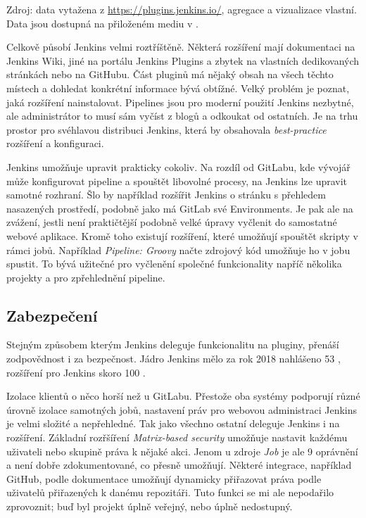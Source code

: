{\begin{iffigure}
                \caption{Zdroj: data vytažena z \url{https://plugins.jenkins.io/}, agregace a vizualizace vlastní. Data jsou dostupná na přiloženém mediu v .}
            \end{iffigure}
            \clearpage
        }

        Celkově působí Jenkins velmi roztříštěně. Některá rozšíření mají dokumentaci na Jenkins Wiki, jiné na portálu Jenkins Plugins a zbytek na vlastních dedikovaných stránkách nebo na GitHubu. Část pluginů má nějaký obsah na všech těchto místech a dohledat konkrétní informace bývá obtížné. Velký problém je poznat, jaká rozšíření nainstalovat. Pipelines jsou pro moderní použití Jenkins nezbytné, ale administrátor to musí sám vyčíst z blogů a odkoukat od ostatních. Je na trhu prostor pro svéhlavou distribuci Jenkins, která by obsahovala \textit{best-practice} rozšíření a konfiguraci.

        Jenkins umožňuje upravit prakticky cokoliv. Na rozdíl od GitLabu, kde vývojář může konfigurovat pipeline a spouštět libovolné procesy, na Jenkins lze upravit samotné rozhraní. Šlo by například rozšířit Jenkins o stránku s přehledem nasazených prostředí, podobně jako má GitLab své Environments. Je pak ale na zvážení, jestli není praktičtější podobně velké úpravy vyčlenit do samostatné webové aplikace. Kromě toho existují rozšíření, které umožňují spouštět skripty v rámci jobů. Například \textit{Pipeline: Groovy} načte zdrojový kód umožňuje ho v jobu spustit. To bývá užitečné pro vyčlenění společné funkcionality napříč několika projekty a pro zpřehlednění pipeline.

    \subsection{Zabezpečení}
        Stejným způsobem kterým Jenkins deleguje funkcionalitu na pluginy, přenáší zodpovědnost i za bezpečnost. Jádro Jenkins mělo za rok 2018 nahlášeno 53 , rozšíření pro Jenkins skoro 100 \cite{cve-jenkins}. 

        Izolace klientů o něco horší než u GitLabu. Přestože oba systémy podporují různé úrovně izolace samotných jobů, nastavení práv pro webovou administraci Jenkins je velmi složité a nepřehledné. Tak jako všechno ostatní deleguje Jenkins i  na rozšíření. Základní rozřšíření \textit{Matrix-based security} umožňuje nastavit každému uživateli nebo skupině práva k nějaké akci. Jenom u zdroje \textit{Job} je ale 9 oprávnění a není dobře zdokumentované, co přesně umožňují. Některé integrace, například GitHub, podle dokumentace umožňují dynamicky přiřazovat práva podle uživatelů přiřazených k danému repozitáři. Tuto funkci se mi ale nepodařilo zprovoznit; buď byl projekt úplně veřejný, nebo úplně nedostupný.

